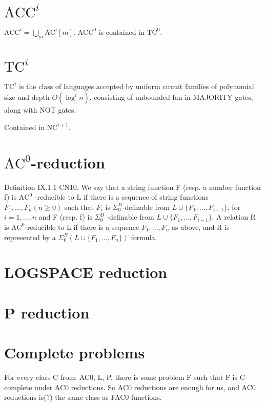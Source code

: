 \section{$\text{ACC}^i$}
$\text{ACC}^i = \bigcup_m \text{AC}^i[m]$. $\text{ACC}^0$ is contained in $\text{TC}^0$.

\section{$\text{TC}^i$}
$\text{TC}^i$ is the class of languages accepted by uniform circuit families 
of polynomial size and depth $O(\log^i n)$, consisting of unbounded fan-in MAJORITY
gates, along with NOT gates.

Contained in $\text{NC}^{i + 1}$.

\section{$\text{AC}^0$-reduction}
\label{sec:ac0red}
Definition IX.1.1 CN10. We say that a string function F
(resp. a number function f) is $\text{AC}^0$ -reducible to L if there is a sequence
of string functions $F_1, \dots, F_n (n \geqslant 0)$ such that
$F_i$ is $\Sigma^B_0$-definable from $L \cup \{F_1, \dots , F_{i-1}\}$, for $i = 1, \dots, n$
and F (resp. f) is $\Sigma^B_0$ -definable from $L \cup \{F_1, \dots , F_{i-1}\}$. A relation R is
$\text{AC}^0$-reducible to L if there is a sequence $F_1, \dots, F_n$ as above, and R is
represented by a $\Sigma^B_0(L \cup \{F_1, \dots, F_n\})$ formula.

\section{LOGSPACE reduction}

\section{P reduction}

\section{Complete problems}
\label{sec:complete-problems}
For every class C from: AC0, L, P, there is some problem F such that F is C-complete under AC0 reductions.
So AC0 reductions are enough for us, and AC0 reductions is(?) the same class as FAC0 functions.

